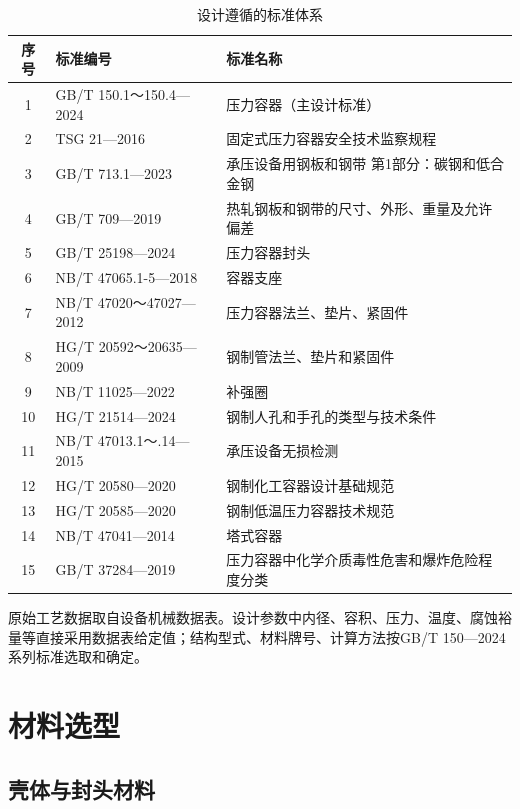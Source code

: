 \begin{table}[!htb]
  \centering
  \caption{设计遵循的标准体系}
  \label{tab:main-standards}
  \small\renewcommand{\arraystretch}{1.1}
  \setlength{\tabcolsep}{7pt}
  \begin{tabularx}{\textwidth}{@{}c >{\centering\arraybackslash}X >{\centering\arraybackslash}X@{}}
    \toprule
    \textbf{序号} & \textbf{标准编号} & \textbf{标准名称} \\
    \midrule
    1  & GB/T 150.1～150.4—2024 & 压力容器（主设计标准） \\
    2  & TSG 21—2016           & 固定式压力容器安全技术监察规程 \\
    3  & GB/T 713.1—2023       & 承压设备用钢板和钢带 第1部分：碳钢和低合金钢 \\
    4  & GB/T 709—2019         & 热轧钢板和钢带的尺寸、外形、重量及允许偏差 \\
    5  & GB/T 25198—2024       & 压力容器封头 \\
    6  & NB/T 47065.1-5—2018   & 容器支座 \\
    7  & NB/T 47020～47027—2012 & 压力容器法兰、垫片、紧固件 \\
    8  & HG/T 20592～20635—2009 & 钢制管法兰、垫片和紧固件 \\
    9  & NB/T 11025—2022       & 补强圈 \\
    10 & HG/T 21514—2024       & 钢制人孔和手孔的类型与技术条件 \\
    11 & NB/T 47013.1～.14—2015 & 承压设备无损检测 \\
    12 & HG/T 20580—2020       & 钢制化工容器设计基础规范 \\
    13 & HG/T 20585—2020       & 钢制低温压力容器技术规范 \\
    14 & NB/T 47041—2014       & 塔式容器 \\
    15 & GB/T 37284—2019       & 压力容器中化学介质毒性危害和爆炸危险程度分类 \\
    \bottomrule
  \end{tabularx}
\end{table}

原始工艺数据取自设备机械数据表。设计参数中内径、容积、压力、温度、腐蚀裕量等直接采用数据表给定值；结构型式、材料牌号、计算方法按GB/T 150—2024系列标准选取和确定。

\section{材料选型}

\subsection{壳体与封头材料}

